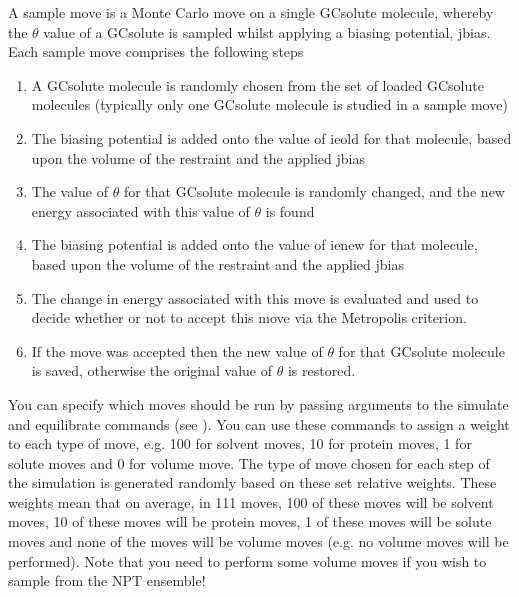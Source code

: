 \documentclass[letterpaper,10pt,english]{sphinxmanual}
\begin{document}
\ignorespaces 
{}

A sample move is a Monte Carlo move on a single GCsolute molecule, whereby the \(\theta\) value of a GCsolute is sampled whilst applying a biasing potential, jbias. Each sample move comprises the following steps
\begin{enumerate}
\item {} 
A GCsolute molecule is randomly chosen from the set of loaded GCsolute molecules (typically only one GCsolute molecule is studied in a sample move)

\item {} 
The biasing potential is added onto the value of ieold for that molecule, based upon the volume of the restraint and the applied jbias

\item {} 
The value of \(\theta\) for that GCsolute molecule is randomly changed, and the new energy associated with this value of \(\theta\) is found

\item {} 
The biasing potential is added onto the value of ienew for that molecule, based upon the volume of the restraint and the applied jbias

\item {} 
The change in energy associated with this move is evaluated and used to decide whether or not to accept this move via the Metropolis criterion.

\item {} 
If the move was accepted then the new value of \(\theta\) for that GCsolute molecule is saved, otherwise the original value of \(\theta\) is restored.

\end{enumerate}

\ignorespaces 
{}

You can specify which moves should be run by passing arguments to the simulate and equilibrate commands (see {\hyperref[\detokenize{protoms:runcmd}]{}}). You can use these commands to assign a weight to each type of move, e.g. 100 for solvent moves, 10 for protein moves, 1 for solute moves and 0 for volume move. The type of move chosen for each step of the simulation is generated randomly based on these set relative weights. These weights mean that on average, in 111 moves, 100 of these moves will be solvent moves, 10 of these moves will be protein moves, 1 of these moves will be solute moves and none of the moves will be volume moves (e.g. no volume moves will be performed). Note that you need to perform some volume moves if you wish to sample from the NPT ensemble!
\end{document}
